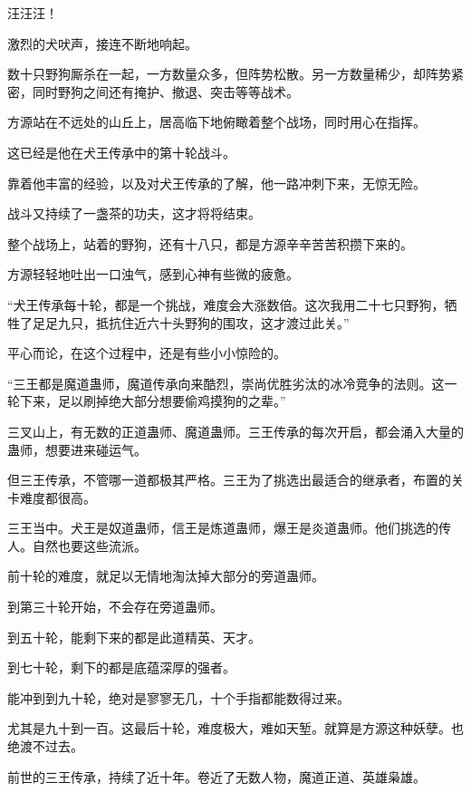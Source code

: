 
\begin{this_body}

汪汪汪！

激烈的犬吠声，接连不断地响起。

数十只野狗厮杀在一起，一方数量众多，但阵势松散。另一方数量稀少，却阵势紧密，同时野狗之间还有掩护、撤退、突击等等战术。

方源站在不远处的山丘上，居高临下地俯瞰着整个战场，同时用心在指挥。

这已经是他在犬王传承中的第十轮战斗。

靠着他丰富的经验，以及对犬王传承的了解，他一路冲刺下来，无惊无险。

战斗又持续了一盏茶的功夫，这才将将结束。

整个战场上，站着的野狗，还有十八只，都是方源辛辛苦苦积攒下来的。

方源轻轻地吐出一口浊气，感到心神有些微的疲惫。

“犬王传承每十轮，都是一个挑战，难度会大涨数倍。这次我用二十七只野狗，牺牲了足足九只，抵抗住近六十头野狗的围攻，这才渡过此关。”

平心而论，在这个过程中，还是有些小小惊险的。

“三王都是魔道蛊师，魔道传承向来酷烈，崇尚优胜劣汰的冰冷竞争的法则。这一轮下来，足以刷掉绝大部分想要偷鸡摸狗的之辈。”

三叉山上，有无数的正道蛊师、魔道蛊师。三王传承的每次开启，都会涌入大量的蛊师，想要进来碰运气。

但三王传承，不管哪一道都极其严格。三王为了挑选出最适合的继承者，布置的关卡难度都很高。

三王当中。犬王是奴道蛊师，信王是炼道蛊师，爆王是炎道蛊师。他们挑选的传人。自然也要这些流派。

前十轮的难度，就足以无情地淘汰掉大部分的旁道蛊师。

到第三十轮开始，不会存在旁道蛊师。

到五十轮，能剩下来的都是此道精英、天才。

到七十轮，剩下的都是底蕴深厚的强者。

能冲到到九十轮，绝对是寥寥无几，十个手指都能数得过来。

尤其是九十到一百。这最后十轮，难度极大，难如天堑。就算是方源这种妖孽。也绝渡不过去。

前世的三王传承，持续了近十年。卷近了无数人物，魔道正道、英雄枭雄。


\end{this_body}

